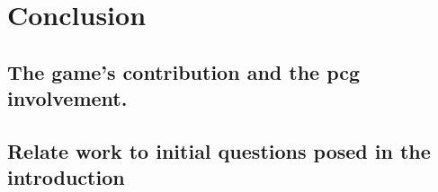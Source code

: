 \chapter{Conclusion}
\section{The game's contribution and the pcg involvement. }
\section{Relate work to initial questions posed in the introduction}

